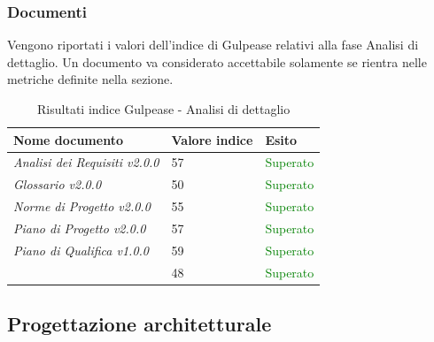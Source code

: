 	 	\subsubsection{Documenti}
	 	Vengono riportati i valori dell'indice di Gulpease relativi alla fase Analisi di dettaglio. Un documento va considerato accettabile solamente se rientra nelle metriche definite nella sezione.
		\begin{table}[!ht]
			\begin{center}
				\begin{tabularx}{0.9\textwidth}{|l|l|X|}
					\hline
					\textbf{Nome documento} & \textbf{Valore indice} & \textbf{Esito}\\
					\hline						
					\emph{Analisi dei Requisiti v2.0.0} & 57 & \textcolor{green}{Superato}\\
					\hline
					\emph{Glossario v2.0.0} & 50 & \textcolor{green}{Superato}\\
					\hline					
					\emph{Norme di Progetto v2.0.0} & 55 & \textcolor{green}{Superato}\\
					\hline					
					\emph{Piano di Progetto v2.0.0} & 57 & \textcolor{green}{Superato}\\
					\hline					
					\emph{Piano di Qualifica v1.0.0} & 59 & \textcolor{green}{Superato}\\
					\hline					
					\docNameVersionSdF & 48 & \textcolor{green}{Superato}\\
					\hline				
				\end{tabularx}
			\end{center}
			\caption{Risultati indice Gulpease - Analisi di dettaglio}
		\end{table}
		
	\subsection{Progettazione architetturale}
